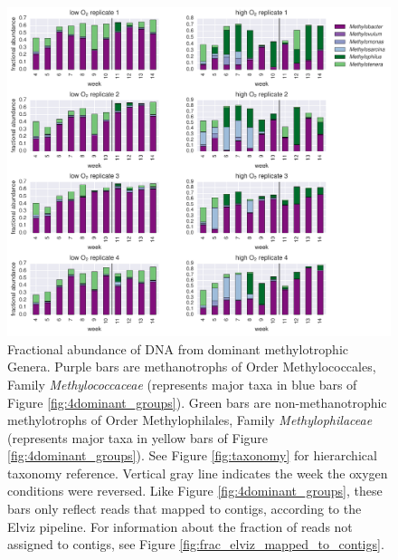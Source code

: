 \begin{figure}[H]
\centering
    \includegraphics[width=1.0\textwidth]{./tex/chapter2/figures/170313_methanotroph_methylotroph_taxa--portrait.pdf}  %
    \begin{singlespace}
    \caption[Dominant methanotrophic and methylotrophic Genera]{
        Fractional abundance of DNA from dominant methylotrophic Genera.
        Purple bars are methanotrophs of Order Methylococcales, Family \textit{Methylococcaceae}
            (represents major taxa in blue bars of Figure \ref{fig:4dominant_groups}).
        Green bars are non-methanotrophic methylotrophs of Order Methylophilales, Family \textit{Methylophilaceae}
            (represents major taxa in yellow bars of Figure \ref{fig:4dominant_groups}).
        See Figure \ref{fig:taxonomy} for hierarchical taxonomy reference.
        Vertical gray line indicates the week the oxygen conditions were reversed.
        Like Figure \ref{fig:4dominant_groups}, these bars only reflect reads that mapped to contigs, according to the Elviz pipeline.
        For information about the fraction of reads not assigned to contigs, see Figure \ref{fig:frac_elviz_mapped_to_contigs}.
        }  %
    \label{fig:dominant_genera}
    \end{singlespace}
\end{figure}

